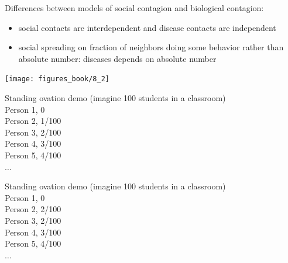 \documentclass[aspectratio=169]{beamer}
\begin{document}
\begin{frame}

Differences between models of social contagion and biological contagion:
\begin{itemize}
\item social contacts are interdependent and disease contacts are independent
\pause
\item social spreading on fraction of neighbors doing some behavior rather than absolute number: diseases depends on absolute number
\end{itemize}

\end{frame}
\begin{frame}

\begin{center}
\texttt{[image: figures\_book/8\_2]}
\end{center}

\end{frame}
\begin{frame}

Standing ovation demo (imagine 100 students in a classroom)\\
\pause
Person 1, 0\\
Person 2, 1/100\\
Person 3, 2/100\\
Person 4, 3/100\\
Person 5, 4/100\\
$\ldots$

\end{frame}
\begin{frame}

Standing ovation demo (imagine 100 students in a classroom)\\
\pause
Person 1, 0\\
Person 2, 2/100\\
Person 3, 2/100\\
Person 4, 3/100\\
Person 5, 4/100\\
$\ldots$

\end{frame}
\end{document}
